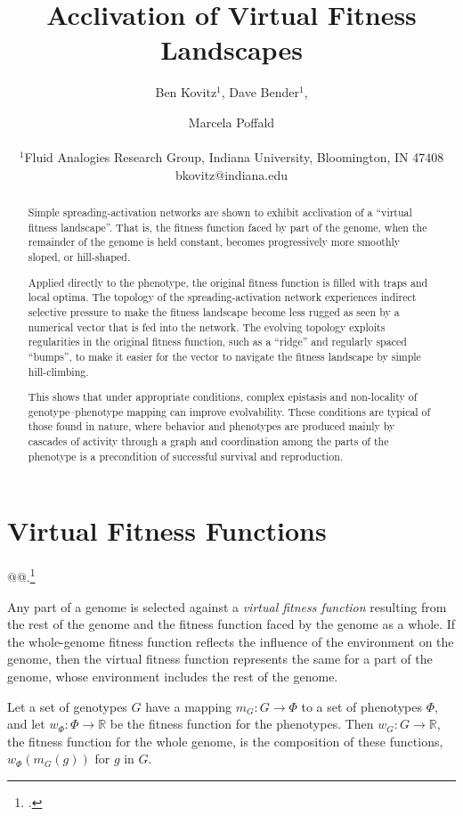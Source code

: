 \documentclass[letterpaper]{article}
\title{Acclivation of Virtual Fitness Landscapes}
\author{Ben Kovitz$^{1}$, Dave Bender$^{1}$, \and Marcela Poffald \\
\mbox{}\\
$^1$Fluid Analogies Research Group, Indiana University, Bloomington, IN 47408 \\
bkovitz@indiana.edu}
\begin{document}
\maketitle

\begin{abstract}
Simple spreading-activation networks are shown to exhibit acclivation of a
``virtual fitness landscape''. That is, the fitness function faced by part of
the genome, when the remainder of the genome is held constant, becomes
progressively more smoothly sloped, or hill-shaped.

Applied directly to the phenotype, the original fitness function is filled
with traps and local optima. The topology of the spreading-activation network
experiences indirect selective pressure to make the fitness landscape become
less rugged as seen by a numerical vector that is fed into the network.
The evolving topology exploits regularities in the original fitness
function, such as a ``ridge'' and regularly spaced ``bumps'', to make it
easier for the vector to navigate the fitness landscape by simple
hill-climbing.

This shows that under appropriate conditions, complex \mbox{epistasis} and
non-locality of genotype--phenotype mapping can improve evolvability. These
conditions are typical of those found in nature, where behavior and phenotypes
are produced mainly by cascades of activity through a graph and coordination
among the parts of the phenotype is a precondition of successful survival and
reproduction.

\end{abstract}

%

\section{Virtual Fitness Functions}
@@.\footnote{\cite{hogeweg2012toward}.}

Any part of a genome is selected against a \textit{virtual fitness function}
resulting from the rest of the genome and the fitness function faced by the
genome as a whole. If the whole-genome fitness function reflects the influence
of the environment on the genome, then the virtual fitness function represents
the same for a part of the genome, whose environment includes the rest of
the genome.

Let a set of genotypes $G$ have a mapping $m_{G} : G \rightarrow \Phi$ to a set
of phenotypes $\Phi$, and let $w_\Phi : \Phi \rightarrow \mathbb{R}$ be the
fitness function for the phenotypes. Then $w_G : G \rightarrow \mathbb{R}$, the
fitness function for the whole genome, is the composition of these functions,
$w_\Phi(m_{G}(g))$ for $g$ in $G$.
\end{document}
